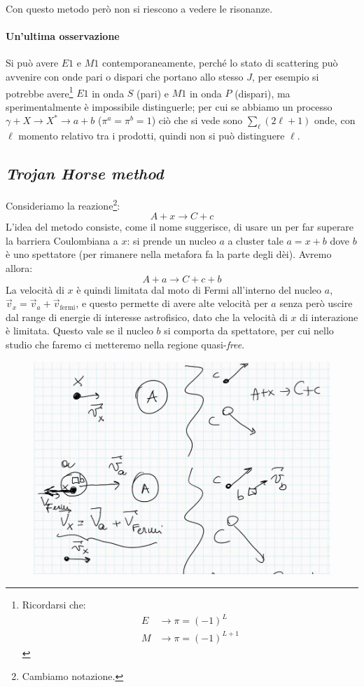 \noindent Con questo metodo però non si riescono a vedere le risonanze.

\paragraph{Un'ultima osservazione} Si può avere $E1$ e $M1$ contemporaneamente, perché lo stato di scattering può avvenire con onde pari o dispari che portano allo stesso $J$, per esempio si potrebbe avere\footnote{Ricordarsi che:%
\begin{align*}
	E&\to\pi=(-1)^L \\
	M&\to\pi=(-1)^{L+1} 
\end{align*}%
} $E1$ in onda $S$ (pari) e $M1$ in onda $P$ (dispari), ma sperimentalmente è impossibile distinguerle; per cui se abbiamo un processo $\gamma + X \to X^* \to a+b$ ($\pi^a=\pi^b=1$) ciò che si vede sono $\sum_\ell (2\ell+1)$ onde, con $\ell$ momento relativo tra i prodotti, quindi non si può distinguere $\ell$.
\newpage
\subsection{\textit{Trojan Horse method}}
Consideriamo la reazione\footnote{Cambiamo notazione.}:
$$A+x \to C+c$$
L'idea del metodo consiste, come il nome suggerisce, di usare un  per far superare la barriera Coulombiana a $x$: si prende un nucleo $a$ a cluster tale $a=x+b$ dove $b$ è uno spettatore (per rimanere nella metafora fa la parte degli dèi). Avremo allora:
$$A+a \to C+c + b$$
La velocità di $x$ è quindi limitata dal moto di Fermi all'interno del nucleo $a$, $\vec{v}_x = \vec{v}_a + \vec{v}_\text{fermi}$, e questo permette di avere alte velocità per $a$ senza però uscire dal range di energie di interesse astrofisico, dato che la velocità di $x$ di interazione è limitata. Questo vale se il nucleo $b$ si comporta da spettatore, per cui nello studio che faremo ci metteremo nella regione quasi-\textit{free}.

\begin{figure}[ht]
	\centering
	\includegraphics[scale=0.5]{Immagini/0419_scontro.png}
	\caption{}
	\label{0419_scontro}
\end{figure}

